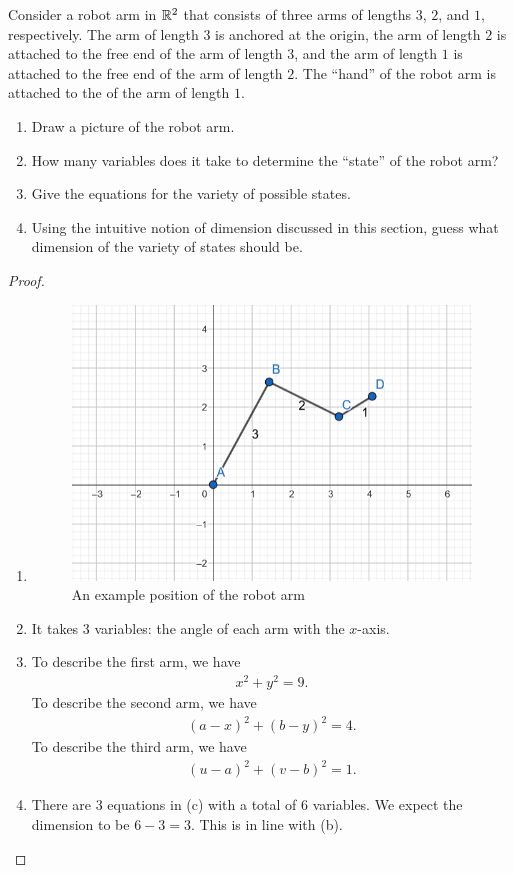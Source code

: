 \begin{exercise}{13}
Consider a robot arm in $\mathbb{R}^2$ that consists of three arms of lengths $3$, $2$, and $1$, respectively. 
The arm of length $3$ is anchored at the origin, the arm of length $2$ is attached to the free end of the arm of length $3$, and the arm of length $1$ is attached to the free end of the arm of length $2$. 
The ``hand'' of the robot arm is attached to the of the arm of length $1$.
\begin{enumerate}
    \item Draw a picture of the robot arm.
    \item How many variables does it take to determine the ``state'' of the robot arm?
    \item Give the equations for the variety of possible states.
    \item Using the intuitive notion of dimension discussed in this section, guess what dimension of the variety of states should be.
\end{enumerate}
\end{exercise}
\begin{proof}
    \begin{enumerate}
        \item 
\begin{figure}[H]
        \centering
        \includegraphics[width=0.5\linewidth]{cox-little-oshea/assets/sec1-2-ex13.png}
        \caption{An example position of the robot arm}
        \label{fig:sec1-2-ex13}
    \end{figure}
    \item It takes $3$ variables: 
    the angle of each arm with the $x$-axis.
    \item To describe the first arm, we have
    \begin{align*}
        x^2 + y^2 = 9.
    \end{align*}
    To describe the second arm, we have
    \begin{align*}
        (a-x)^2 + (b-y)^2 = 4.
    \end{align*}    
    To describe the third arm, we have
    \begin{align*}
        (u-a)^2 + (v-b)^2 = 1.
    \end{align*}
    \item There are $3$ equations in (c) with a total of $6$ variables. 
    We expect the dimension to be $6-3 = 3$. 
    This is in line with (b).
\end{enumerate}
\end{proof}

